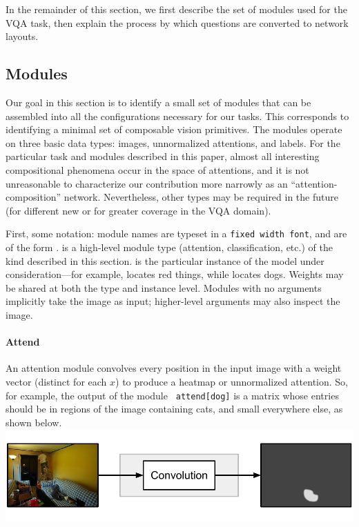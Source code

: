 \documentclass[10pt,twocolumn,letterpaper]{article}
\begin{document}
In the remainder of this section, we first describe the set of modules used for
the VQA task, then explain the process by which questions are converted to
network layouts.

\subsection{Modules}

Our goal in this section is to identify a small set of modules that can be
assembled into all the configurations necessary for our tasks. This corresponds
to identifying a minimal set of composable vision primitives. The modules
operate on three basic data types: images, unnormalized attentions, and labels.
For the particular task and modules described in this paper, almost all
interesting compositional phenomena occur in the space of attentions, and it is
not unreasonable to characterize our contribution more narrowly as an
``attention-composition'' network. Nevertheless, other types may be
required in the future (for different new or for greater coverage in the VQA
domain).

First, some notation: module names are typeset in a {\tt fixed width font}, and
are of the form .  is a
high-level module type (attention, classification, etc.) of the kind described
in this section.  is the particular instance of the model under
consideration---for example,  locates red things, while
 locates dogs. Weights may be shared at both the type and
instance level. Modules with no arguments implicitly take the image as input;
higher-level arguments may also inspect the image.

\paragraph{Attend}

An attention module  convolves every position in the input
image with a weight vector (distinct for each $x$) to produce a heatmap or
unnormalized attention. So, for example, the output of the module {\small\tt
attend[dog]} is a matrix whose entries should be in regions of the image
containing cats, and small everywhere else, as shown below.\\
\includegraphics[width=\columnwidth]{fig/attend}
\end{document}
